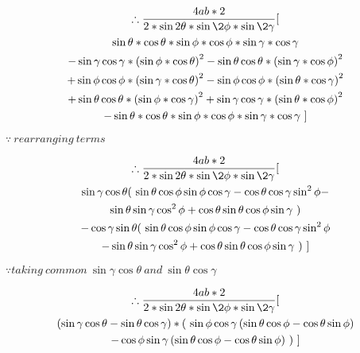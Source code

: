 \documentclass[journal,12pt,twocolumn]{IEEEtran}
\begin{document}
\vspace{0.8cm}
\begin{multline*}
        \therefore \frac{4ab*2}{2*\sin2\theta*\sin\2\phi*\sin\2\gamma}[ \\
        \sin\theta*\cos\theta*\sin\phi*\cos\phi*\sin\gamma*\cos\gamma \\-\sin\gamma\cos\gamma* \left( \sin\phi*\cos\theta \right)^2-
        \sin\theta\cos\theta* \left( \sin\gamma*\cos\phi \right)^2\\+\sin\phi\cos\phi* \left( \sin\gamma*\cos\theta \right)^2-\sin\phi\cos\phi* \left( \sin\theta*\cos\gamma \right)^2 \\+
        \sin\theta\cos\theta* \left( \sin\phi*\cos\gamma \right)^2+ \sin\gamma\cos\gamma* \left( \sin\theta*\cos\phi \right)^2\\ - \sin\theta*\cos\theta*\sin\phi*\cos\phi*\sin\gamma*\cos\gamma~
        ]
\end{multline*}
\begin{flushright}
$\because ~rearranging ~terms$
\end{flushright}
\vspace{0.8cm}
\begin{multline*}
    \therefore \frac{4ab*2}{2*\sin2\theta*\sin\2\phi*\sin\2\gamma}
    [\\ 
    \sin\gamma\cos\theta (~ \sin\theta\cos\phi\sin\phi\cos\gamma  -\cos\theta\cos\gamma\sin^2\phi -\\ \sin\theta\sin\gamma\cos^2\phi +
        \cos\theta\sin\theta\cos\phi\sin\gamma~ )
    \\-\cos\gamma\sin\theta ( ~\sin\theta\cos\phi\sin\phi\cos\gamma - \cos\theta\cos\gamma\sin^2\phi \\ - \sin\theta\sin\gamma\cos^2\phi+ \cos\theta\sin\theta\cos\phi\sin\gamma ~)~]
\end{multline*}
\begin{flushright}
$\because taking~ common ~\sin\gamma\cos\theta ~and~ \sin\theta\cos\gamma$
\end{flushright}

\vspace{0.8cm}
\begin{multline*}
        \therefore \frac{4ab*2}{2*\sin2\theta*\sin\2\phi*\sin\2\gamma}
        [\\  (\sin\gamma\cos\theta - \sin\theta\cos\gamma)* (~ \sin\phi\cos\gamma \left( \sin\theta\cos\phi -\cos\theta\sin\phi  \right)\\ - \cos\phi\sin\gamma\left( \sin\theta\cos\phi -\cos\theta\sin\phi  \right)~ )~
        ]
\end{multline*}
\end{document}
